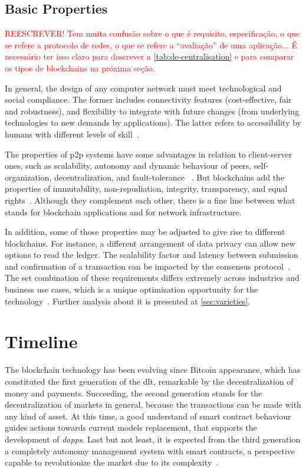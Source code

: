 \subsection*{Basic Properties}
\label{ssec:properties}

\textcolor{red}{REESCREVER! Tem muita confusão sobre o que é requisito, especificação, o que se refere a protocolo de redes, o que se refere a ``avaliação'' de uma aplicação... É necessário ter isso claro para descrever a \autoref{tab:de-centralisation} e para comparar os tipos de blockchains na próxima seção.}

In general, the design of any computer network must meet technological and social compliance.
The former includes connectivity features (cost-effective, fair and robustness),
and flexibility to integrate with future changes (from underlying technologies to new demands by applications).
The latter refers to accessibility by humans with different levels of skill~\cite{book:net-sys}.

The properties of \gls{p2p} systems have some advantages in relation to client-server ones, such as scalability, %
autonomy and dynamic behaviour of peers,
self-organization,
decentralization, and
fault-tolerance %
~\cite{book:p2p-mob}.
But blockchains add the properties of
immutability, %
non-repudiation, %
integrity,
transparency, and
equal rights~\cite{xu2017}.
Although they complement each other, there is a fine line between what stands for blockchain applications and for network infrastructure.

In addition, some of those properties may be adjusted to give rise to different blockchains.
For instance, a different arrangement of data privacy can allow new options to read the ledger.
The scalability factor and latency between submission and confirmation of a transaction can be impacted by the consensus protocol~\cite{xu2017}.
The set combination of these requirements differs extremely across industries and business use cases, which is a unique optimization opportunity for the technology~\cite{hyper1}.
Further analysis about it is presented at \autoref{sec:varieties}.

\section{Timeline}
\label{sec:timeline}

The blockchain technology has been evolving since Bitcoin appearance, which has constituted the first generation of the \gls{dlt}, remarkable by the decentralization of money and payments.
Succeeding, the second generation stands for the decentralization of markets in general, because the transactions can be made with any kind of asset.
At this time, a good understand of smart contract behaviour guides actions towards current models replacement, that supports the development of \emph{\glspl{dapp}}.
Last but not least, it is expected from the third generation a completely autonomy management system with smart contracts,
a perspective capable to revolutionize the market due to its complexity~\cite{swan2015blockchain}.

